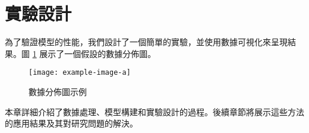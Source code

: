 \section{實驗設計}

為了驗證模型的性能，我們設計了一個簡單的實驗，並使用數據可視化來呈現結果。圖 \ref{fig:example_figure} 展示了一個假設的數據分佈圖。

\begin{figure}[htbp]
  \centering
  \texttt{[image: example-image-a]}
  \caption{數據分佈圖示例}
  \label{fig:example_figure}
\end{figure}

本章詳細介紹了數據處理、模型構建和實驗設計的過程。後續章節將展示這些方法的應用結果及其對研究問題的解決。
